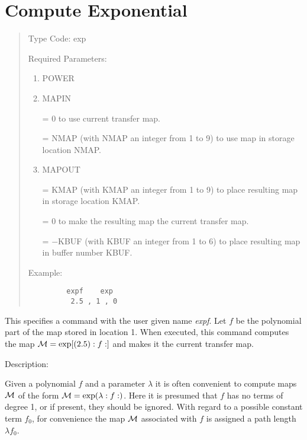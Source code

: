 \section{Compute Exponential} 
\begin{quotation}
\noindent     Type Code:  exp
\vspace{5mm}

\noindent Required Parameters:
\begin{enumerate}
      \item  POWER

      \item  MAPIN

             = 0 to use current transfer map.

             = NMAP (with NMAP an integer from 1 to 9) to use map in
               storage location \hspace*{1em}NMAP.

      \item  MAPOUT

             = KMAP (with KMAP an integer from 1 to 9) to place resulting
               map in \hspace*{1em}storage location KMAP.

             = 0 to make the resulting map the current transfer map.

             = $-$KBUF (with KBUF an integer from 1 to 6) to place resulting
               map in \hspace*{1em}buffer number KBUF.
\end{enumerate}

\vspace{5mm}
\noindent Example:
\begin{verbatim}
         expf    exp
          2.5 , 1 , 0
\end{verbatim}
\end{quotation}
This specifies a command with the user given name {\em expf}.  Let $f$ be the polynomial part of the map stored in location 1.  When executed, this command computes the map ${\cal M} = \exp [(2.5):f:]$ and makes it the current transfer map.

\vspace{5mm}
     Description:
\vspace{2mm}

Given a polynomial $f$ and a parameter $\lambda$ it is often convenient to compute maps ${\cal M}$ of the form ${\cal M} = \exp (\lambda :f:)$.  Here it is presumed that $f$ has no terms of degree 1, or if present, they should be ignored.  With regard to a possible constant term $f_0$, for convenience the map ${\cal M}$ associated with $f$ is assigned a path length $\lambda f_0$.

